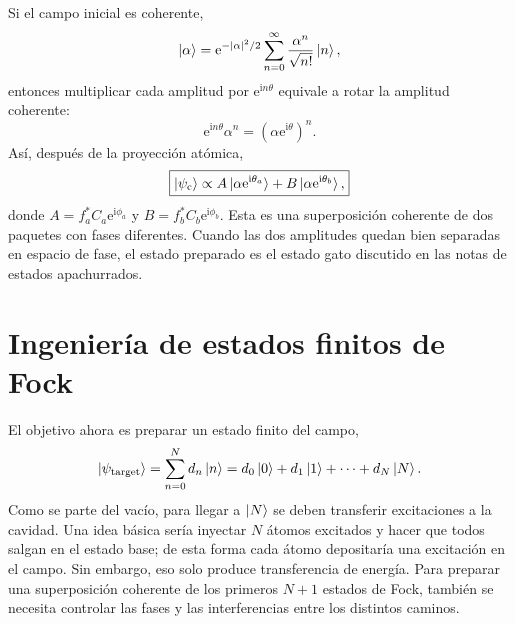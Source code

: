 \documentclass[11pt]{article}
\newcommand{\ii}{\mathrm{i}}
\newcommand{\ee}{\mathrm{e}}
\begin{document}
Si el campo inicial es coherente,
\begin{equation}
  \ket{\alpha}
  =
  \ee^{-|\alpha|^2/2}
  \sum_{n=0}^{\infty}
  \frac{\alpha^n}{\sqrt{n!}}\ket{n},
\end{equation}
entonces multiplicar cada amplitud por $\ee^{\ii n\theta}$ equivale a rotar la
amplitud coherente:
\begin{equation}
  \ee^{\ii n\theta}\alpha^n
  =
  \left(\alpha\ee^{\ii\theta}\right)^n.
\end{equation}
As\'i, despu\'es de la proyecci\'on at\'omica,
\begin{equation}
  \boxed{
  \ket{\psi_{\mathrm{c}}}
  \propto
  A\ket{\alpha\ee^{\ii\theta_a}}
  +
  B\ket{\alpha\ee^{\ii\theta_b}},
  }
\end{equation}
donde $A=f_a^*C_a\ee^{\ii\phi_a}$ y $B=f_b^*C_b\ee^{\ii\phi_b}$. Esta es una
superposici\'on coherente de dos paquetes con fases diferentes. Cuando las dos
amplitudes quedan bien separadas en espacio de fase, el estado preparado es el
estado gato discutido en las notas de estados apachurrados.

\section{Ingenier\'ia de estados finitos de Fock}

El objetivo ahora es preparar un estado finito del campo,
\begin{equation}
  \ket{\psi_{\mathrm{target}}}
  =
  \sum_{n=0}^{N}d_n\ket{n}
  =
  d_0\ket{0}+d_1\ket{1}+\cdots+d_N\ket{N}.
\end{equation}
Como se parte del vac\'io, para llegar a $\ket{N}$ se deben transferir
excitaciones a la cavidad. Una idea b\'asica ser\'ia inyectar $N$ \'atomos
excitados y hacer que todos salgan en el estado base; de esta forma cada
\'atomo depositar\'ia una excitaci\'on en el campo. Sin embargo, eso solo
produce transferencia de energ\'ia. Para preparar una superposici\'on coherente
de los primeros $N+1$ estados de Fock, tambi\'en se necesita controlar las
fases y las interferencias entre los distintos caminos.
\end{document}
